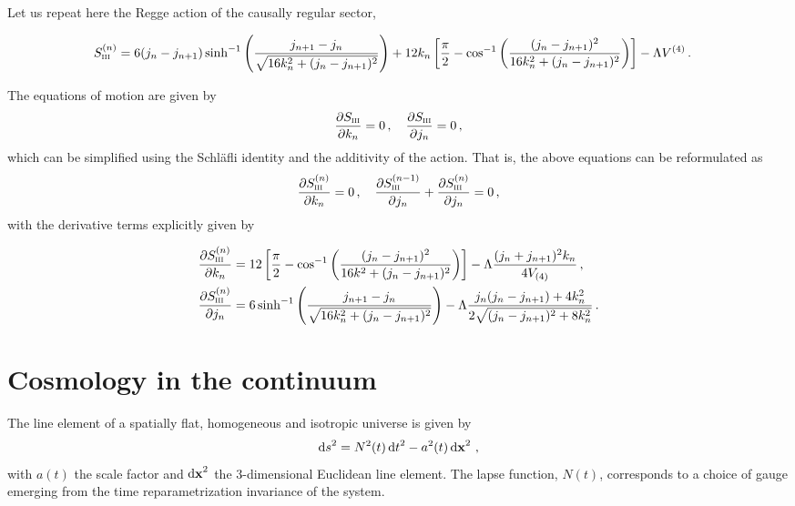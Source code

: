\documentclass[amsmath,amssymb,aps,twocolumn,superscriptaddress,nofootinbib]{revtex4-1}
\begin{document}
Let us repeat here the Regge action of the causally regular sector,
\begin{widetext}
\begin{equation}
\begin{aligned}
S_{\textsc{iii}}^{(n)} & = 6(j_n-j_{n+1})\sinh^{-1}\left(\frac{j_{n+1}-j_n}{\sqrt{16k_n^2+(j_n-j_{n+1})^2}}\right) + 12k_n\left[\frac{\pi}{2}-\cos^{-1}\left(\frac{(j_n-j_{n+1})^2}{16k_n^2+(j_n-j_{n+1})^2}\right)\right] - \Lambda V^{(4)}\,.
\end{aligned}
\end{equation}  
\end{widetext}
The equations of motion are given by
%
\begin{equation}
\pdv{S_{\textsc{iii}}}{k_n} = 0\,,\quad \pdv{S_{\textsc{iii}}}{j_n} = 0\,,
\end{equation}
%
which can be simplified using the Schl\"{a}fli identity and the additivity of the action.
That is, the above equations can be reformulated as
%
\begin{equation}
\pdv{S_{\textsc{iii}}^{(n)}}{k_n} = 0\,,\quad \pdv{S_{\textsc{iii}}^{(n-1)}}{j_n} + \pdv{S_{\textsc{iii}}^{(n)}}{j_n} = 0\,,
\end{equation}
with the derivative terms explicitly given by
\begin{widetext}
\begin{equation}
\begin{aligned}
\pdv{S_{\textsc{iii}}^{(n)}}{k_n} &= 12\left[\frac{\pi}{2} - \cos^{-1}\left(\frac{(j_n - j_{n+1})^2}{16k^2 + (j_n - j_{n+1})^2}\right)\right] - \Lambda \frac{(j_n+j_{n+1})^2k_n}{4V_{(4)}}\,,\\
\pdv{S_{\textsc{iii}}^{(n)}}{j_n} &= 6\sinh^{-1}\left(\frac{j_{n+1}-j_n}{\sqrt{16k_n^2 + (j_n - j_{n+1})^2}}\right) - \Lambda \frac{j_n(j_n - j_{n+1}) + 4k_n^2}{2\sqrt{(j_n - j_{n+1})^2+8k_n^2}}\,.
\end{aligned}
\end{equation}
\end{widetext}

\section{Cosmology in the continuum}

The line element of a spatially flat, homogeneous and isotropic universe is given by
%
\begin{equation}
\dd{s}^2 = N^2(t)\dd{t}^2 - a^2(t)\dd{\vb{x}}^2\,,
\end{equation}
%
with $a(t)$ the scale factor and $\dd{\vb{x}}^2$ the 3-dimensional Euclidean line element. 
The lapse function, $N(t)$, corresponds to a choice of gauge emerging from the time reparametrization invariance of the system. 
\end{document}
